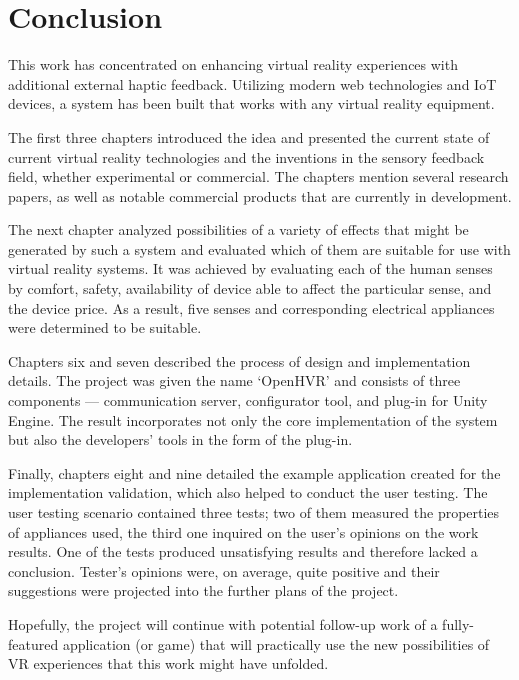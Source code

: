 \chapter{Conclusion}

This work has concentrated on enhancing virtual reality experiences with 
additional external haptic feedback. Utilizing modern web technologies and 
IoT devices, a system has been built that works with any virtual reality 
equipment.

The first three chapters introduced the idea and presented the current state 
of current virtual reality technologies and the inventions in the sensory 
feedback field, whether experimental or commercial. The chapters mention 
several research papers, as well as notable commercial products that are 
currently in development.

The next chapter analyzed possibilities of a variety of effects that might 
be generated by such a system and evaluated which of them are suitable 
for use with virtual reality systems. It was achieved by evaluating each 
of the human senses by comfort, safety, availability of device able to affect 
the particular sense, and the device price. As a result, five senses 
and corresponding electrical appliances were determined to be suitable.

Chapters six and seven described the process of design and implementation 
details. The project was given the name `OpenHVR' and consists of three 
components — communication server, configurator tool, and plug-in for Unity 
Engine. The result incorporates not only the core implementation of 
the system but also the developers' tools in the form of the plug-in.

Finally, chapters eight and nine detailed the example application created 
for the implementation validation, which also helped to conduct the user 
testing. The user testing scenario contained three tests; two of them measured 
the properties of appliances used, the third one inquired on the user's opinions
on the work results. One of the tests produced unsatisfying results 
and therefore lacked a conclusion. Tester's opinions were, on average, 
quite positive and their suggestions were projected into the 
further plans of the project.

Hopefully, the project will continue with potential follow-up work of a 
fully-featured application (or game) that will practically use the new 
possibilities of VR experiences that this work might have unfolded.